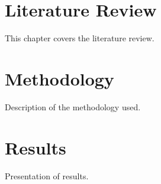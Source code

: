 \documentclass[12pt, a4paper]{report}
\begin{document}
\chapter{Literature Review}
\label{chap:literature}
This chapter covers the literature review.


\chapter{Methodology}
\label{chap:methodology}
Description of the methodology used.

\chapter{Results}
\label{chap:results}
Presentation of results.


\end{document}

